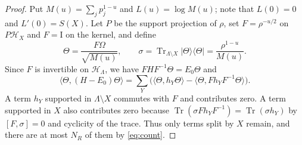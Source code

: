 \documentclass[aps,prx,reprint,superscriptaddress,floatfix,nofootinbib,longbibliography,amsmath,amssymb]{revtex4-2}
\newcommand{\id}{\mathrm{I}}
\newcommand{\Tr}{\operatorname{Tr}}
\providecommand{\ket}[1]{|#1\rangle}\renewcommand{\ket}[1]{|#1\rangle}
\providecommand{\bra}[1]{\langle #1|}\renewcommand{\bra}[1]{\langle #1|}
\newcommand{\cH}{\mathcal H}
\newcommand{\Om}{\Omega}
\newcommand{\Lam}{\Lambda}
\theoremstyle{plain}
\theoremstyle{definition}
\begin{document}
\begin{proof}
Put $M(u)=\sum_jp_j^{1-u}$ and $L(u)=\log M(u)$; note that $L(0)=0$ and
$L'(0)=S(X)$. Let $P$ be the support projection of $\rho$, set
$F=\rho^{-u/2}$ on $P\cH_X$ and $F=\id$ on the kernel, and define
\[
 \Theta=\frac{F\Om}{\sqrt{M(u)}},\qquad
 \sigma=\Tr_{\Lam\setminus X}\ket\Theta\bra\Theta=\frac{\rho^{1-u}}{M(u)} .
\]
Since $F$ is invertible on $\cH_\Lam$, we have $FHF^{-1}\Theta=E_0\Theta$ and
\begin{equation}\label{eq:tiltenergy}
 \langle\Theta,(H-E_0)\Theta\rangle
 =\sum_Y\bigl(\langle\Theta,h_Y\Theta\rangle-\langle\Theta,Fh_YF^{-1}\Theta\rangle\bigr).
\end{equation}
A term $h_Y$ supported in $\Lam\setminus X$ commutes with $F$ and
contributes zero. A term supported in $X$ also contributes zero because
$\Tr(\sigma Fh_YF^{-1})=\Tr(\sigma h_Y)$ by $[F,\sigma]=0$ and cyclicity of
the trace. Thus only terms split by $X$ remain, and there are at most
$N_R$ of them by \eqref{eq:count}.


\end{proof}
\end{document}
